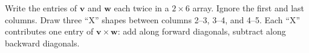 \begin{remark*}
Write the entries of $\mathbf{v}$ and $\mathbf{w}$ each twice in a $2 \times 6$ array.
Ignore the first and last columns.
Draw three ``X'' shapes between columns 2–3, 3–4, and 4–5.
Each ``X'' contributes one entry of $\mathbf{v} \times \mathbf{w}$: add along forward
diagonals, subtract along backward diagonals.
\end{remark*}
